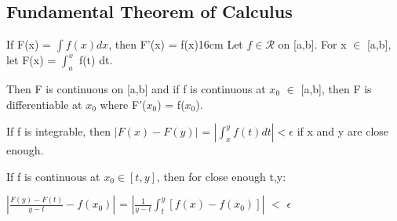     \vspace{0.5cm}





\subsection{ Fundamental Theorem of Calculus }

    \begin{wtheorem}{If F(x) = $\int f(x) dx$, then F'(x) = f(x)}{16cm}
        Let $f \in \mathscr{R}$ on [a,b]. For x $\in$ [a,b], let
        F(x) = $\int_a^x$ f(t) dt.

        Then F is continuous on [a,b] and if f is continuous at $x_0$ $\in$ [a,b],
        then F is differentiable at $x_0$ where F'($x_0$) = f($x_0$).        
    \end{wtheorem}

    \begin{intuition}
        If f is integrable, then $|F(x) - F(y)|$ = $|\int_x^y f(t) dt| < \epsilon$
        if x and y are close enough.

        If f is continuous at $x_0 \in [t,y]$, then for close enough t,y:

        \hspace{0.5cm}
        $|\frac{F(y)-F(t)}{y-t} - f(x_0)|$
        = $|\frac{1}{y-t}\int_t^y [f(x) - f(x_0)]|$
        $<$ $\epsilon$
    \end{intuition}

    \vspace{0.1cm}

